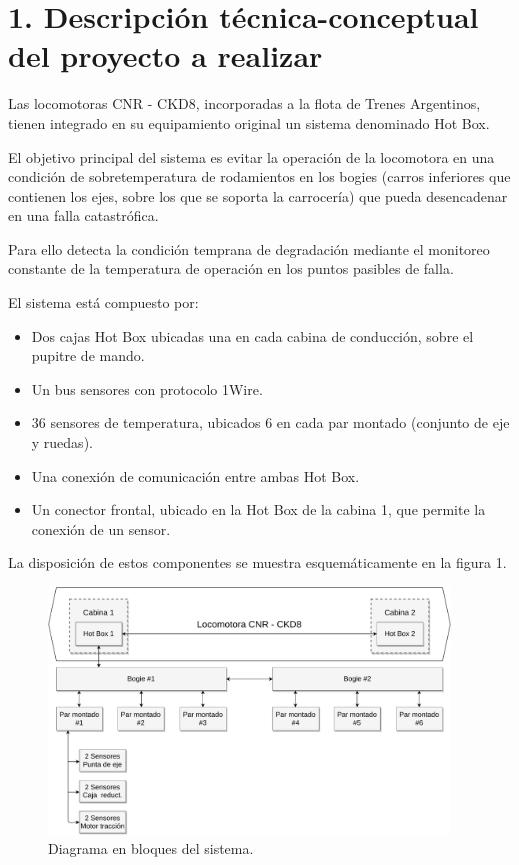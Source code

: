 \documentclass[
11pt, %
codirector, %
]{charter}
\begin{document}
\section{1. Descripción técnica-conceptual del proyecto a realizar}
\label{sec:descripcion}

Las locomotoras CNR - CKD8, incorporadas a la flota de Trenes Argentinos, tienen integrado en su equipamiento original un sistema denominado Hot Box.

El objetivo principal del sistema es evitar la operación de la locomotora en una condición de sobretemperatura de rodamientos en los bogies (carros inferiores que contienen los ejes, sobre los que se soporta la carrocería) que pueda desencadenar en una falla catastrófica.

Para ello detecta la condición temprana de degradación mediante el monitoreo constante de la temperatura de operación en los puntos pasibles de falla.

El sistema está compuesto por:
\begin{itemize}
\item Dos cajas Hot Box ubicadas una en cada cabina de conducción, sobre el pupitre de mando. 
\item Un bus sensores con protocolo 1Wire.
\item 36 sensores de temperatura, ubicados 6 en cada par montado (conjunto de eje y ruedas).
\item Una conexión de comunicación entre ambas Hot Box.
\item Un conector frontal, ubicado en la Hot Box de la cabina 1, que permite la conexión de un sensor.
\end{itemize}
La disposición de estos componentes se muestra esquemáticamente en la figura 1.
\begin{figure}[h]
	\centering
	\includegraphics[angle=0,width=0.95\textwidth]{./Figuras/SMTB_bloques.pdf}
	\caption{Diagrama en bloques del sistema.}
	\label{fig:mesh1}
\end{figure}
\end{document}
